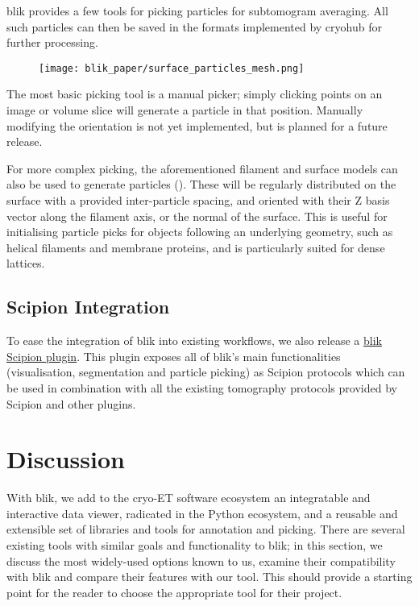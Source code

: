 blik provides a few tools for picking particles for subtomogram averaging. All such particles can then be saved in the formats implemented by cryohub for further processing.

\begin{figure}[!ht]
    \centering
    \texttt{[image: blik\_paper/surface\_particles\_mesh.png]}
    \label{picking-showcase}
\end{figure}

The most basic picking tool is a manual picker; simply clicking points on an image or volume slice will generate a particle in that position. Manually modifying the orientation is not yet implemented, but is planned for a future release.

For more complex picking, the aforementioned filament and surface models can also be used to generate particles (). These will be regularly distributed on the surface with a provided inter-particle spacing, and oriented with their Z basis vector along the filament axis, or the normal of the surface. This is useful for initialising particle picks for objects following an underlying geometry, such as helical filaments and membrane proteins, and is particularly suited for dense lattices.

\subsection{Scipion Integration}\label{scipion-integration}

To ease the integration of blik into existing workflows, we also release a \href{https://github.com/scipion-em/scipion-em-blik}{blik Scipion plugin}. This plugin exposes all of blik's main functionalities (visualisation, segmentation and particle picking) as Scipion protocols which can be used in combination with all the existing tomography protocols provided by Scipion and other plugins.

\section{Discussion}
With blik, we add to the cryo-ET software ecosystem an integratable and interactive data viewer, radicated in the Python ecosystem, and a reusable and extensible set of libraries and tools for annotation and picking. There are several existing tools with similar goals and functionality to blik; in this section, we discuss the most widely-used options known to us, examine their compatibility with blik and compare their features with our tool. This should provide a starting point for the reader to choose the appropriate tool for their project.

